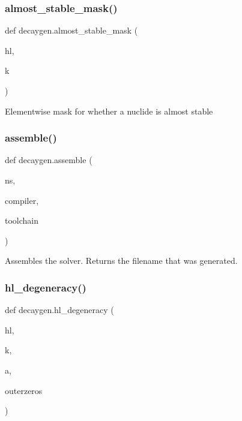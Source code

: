 \subsubsection{\texorpdfstring{almost\+\_\+stable\+\_\+mask()}{almost\_stable\_mask()}}
{\footnotesize\ttfamily def decaygen.\+almost\+\_\+stable\+\_\+mask (\begin{DoxyParamCaption}\item[{}]{hl,  }\item[{}]{k }\end{DoxyParamCaption})}

\begin{DoxyVerb}Elementwise mask for whether a nuclide is almost stable\end{DoxyVerb}
 \mbox{\label{namespacedecaygen_ae1a55c211308fb0ada306dd453b9d5f1}} 
\subsubsection{\texorpdfstring{assemble()}{assemble()}}
{\footnotesize\ttfamily def decaygen.\+assemble (\begin{DoxyParamCaption}\item[{}]{ns,  }\item[{}]{compiler,  }\item[{}]{toolchain }\end{DoxyParamCaption})}

\begin{DoxyVerb}Assembles the solver. Returns the filename that was generated.\end{DoxyVerb}
 \mbox{\label{namespacedecaygen_aa3770d9984327e626888d864436a894f}} 
\subsubsection{\texorpdfstring{hl\+\_\+degeneracy()}{hl\_degeneracy()}}
{\footnotesize\ttfamily def decaygen.\+hl\+\_\+degeneracy (\begin{DoxyParamCaption}\item[{}]{hl,  }\item[{}]{k,  }\item[{}]{a,  }\item[{}]{outerzeros }\end{DoxyParamCaption})}

